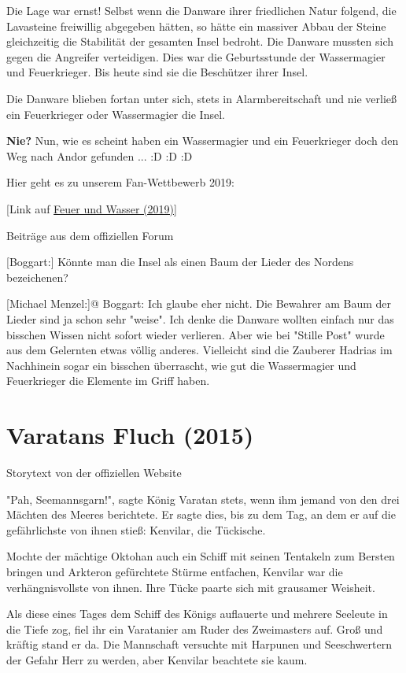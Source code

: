 \documentclass[10pt, a4paper, oneside]{book}
\newcommand{\fillbreak}{\vspace*{\fill}\columnbreak}
\newcommand{\storytext}[1]{%
    \section{#1}%
    \label{Storytext: #1}%
}
\newcommand{\refprodukt}[1]{\hyperref[Produkt: #1]{#1}}
\begin{document}
\begin{multicols}{2}
Die Lage war ernst! Selbst wenn die Danware ihrer friedlichen Natur folgend, die Lavasteine freiwillig abgegeben hätten, so hätte ein massiver Abbau der Steine gleichzeitig die Stabilität der gesamten Insel bedroht. Die Danware mussten sich gegen die Angreifer verteidigen. Dies war die Geburtsstunde der Wassermagier und Feuerkrieger. Bis heute sind sie die Beschützer ihrer Insel.\bigskip

Die Danware blieben fortan unter sich, stets in Alarmbereitschaft und nie verließ ein Feuerkrieger oder Wassermagier die Insel.\bigskip

\textbf{Nie?} Nun, wie es scheint haben ein Wassermagier und ein Feuerkrieger doch den Weg nach Andor gefunden ... :D :D :D\bigskip

Hier geht es zu unserem Fan-Wettbewerb 2019: 

[Link auf \refprodukt{Feuer und Wasser (2019)}]\bigskip

\begin{center}
    Beiträge aus dem offiziellen Forum
\end{center}

[Boggart:] Könnte man die Insel als einen Baum der Lieder des Nordens bezeichenen?

[Michael Menzel:]@ Boggart: Ich glaube eher nicht. Die Bewahrer am Baum der Lieder sind ja schon sehr "weise". Ich denke die Danware wollten einfach nur das bisschen Wissen nicht sofort wieder verlieren. Aber wie bei "Stille Post" wurde aus dem Gelernten etwas völlig anderes. Vielleicht sind die Zauberer Hadrias im Nachhinein sogar ein bisschen überrascht, wie gut die Wassermagier und Feuerkrieger die Elemente im Griff haben.




\fillbreak
\storytext{Varatans Fluch (2015)}

\begin{center}
    Storytext von der offiziellen Website
\end{center}

"Pah, Seemannsgarn!", sagte König Varatan stets, wenn ihm jemand von den drei Mächten des Meeres berichtete. Er sagte dies, bis zu dem Tag, an dem er auf die gefährlichste von ihnen stieß: Kenvilar, die Tückische.

Mochte der mächtige Oktohan auch ein Schiff mit seinen Tentakeln zum Bersten bringen und Arkteron gefürchtete Stürme entfachen, Kenvilar war die verhängnisvollste  von ihnen. Ihre Tücke paarte sich mit grausamer Weisheit.\bigskip

Als diese eines Tages dem Schiff des Königs auflauerte und mehrere Seeleute in die Tiefe zog, fiel ihr ein Varatanier am Ruder des Zweimasters auf. Groß und kräftig stand er da. Die Mannschaft versuchte mit Harpunen und Seeschwertern der Gefahr Herr zu werden, aber Kenvilar beachtete sie kaum.


\end{multicols}
\end{document}

